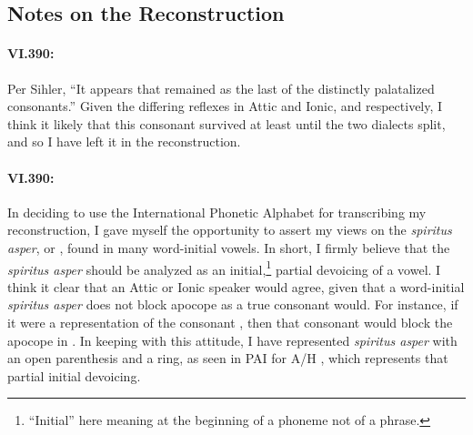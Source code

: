 
\subsection{Notes on the Reconstruction}

\paragraph{VI.390: } Per Sihler, ``It appears that  remained as the last of the distinctly palatalized consonants.''\autocite[198.a]{Sihler_1995} Given the differing reflexes in Attic and Ionic,  and  respectively, I think it likely that this consonant survived at least until the two dialects split, and so I have left it in the reconstruction.

\paragraph{VI.390: } In deciding to use the International Phonetic Alphabet for transcribing my reconstruction, I gave myself the opportunity to assert my views on the \textit{spiritus asper}, or , found in many word-initial vowels. In short, I firmly believe that the \textit{spiritus asper} should be analyzed as an initial,\footnote{``Initial'' here meaning at the beginning of a phoneme not of a phrase.} partial devoicing of a vowel. I think it clear that an Attic or Ionic speaker would agree, given that a word-initial \textit{spiritus asper} does not block apocope as a true consonant would. For instance, if it were a representation of the consonant , then that consonant would block the apocope in . In keeping with this attitude, I have represented \textit{spiritus asper} with an open parenthesis and a ring, as seen in PAI  for A/H , which represents that partial initial devoicing. 

